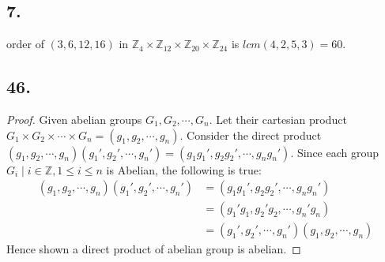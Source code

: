 \documentclass{article}
\begin{document}
\subsection*{7. }
order of $(3,6,12,16)$ in $\mathbb{Z}_4 \times \mathbb{Z}_{12} \times
\mathbb{Z}_{20} \times \mathbb{Z}_{24}$ is $lcm(4,2,5,3) = 60$.

\subsection*{46. }
\begin{proof}Given abelian groups $G_1, G_2, \cdots, G_n$. Let their cartesian
	product $G_1 \times G_2 \times \cdots \times G_n = (g_1,g_2,\cdots,g_n)$.
	Consider the direct product $(g_1,g_2,\cdots,g_n)(g_1',g_2',\cdots,g_n') =
(g_1g_1',g_2g_2',\cdots,g_ng_n')$. Since each group $G_i \mid i\in\mathbb{Z},
1\le i\le n$ is Abelian, the following is true: 
\begin{align*}
(g_1,g_2,\cdots,g_n)(g_1',g_2',\cdots,g_n') &= (g_1g_1',g_2g_2',\cdots,g_ng_n')\\
&= (g_1'g_1,g_2'g_2,\cdots,g_n'g_n)\\
&= (g_1',g_2',\cdots,g_n')(g_1,g_2,\cdots,g_n)
\end{align*}
Hence shown a direct product of abelian group is abelian.
\end{proof}
\end{document}
